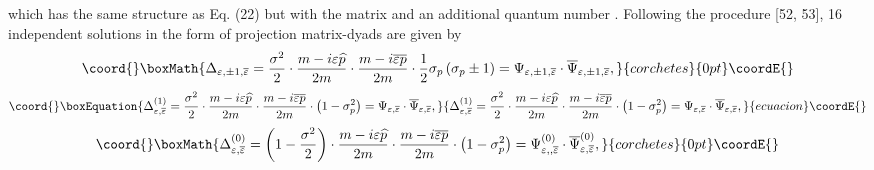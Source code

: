 \documentclass[a4paper,12pt]{article}
\begin{document}
which has the same structure as Eq. (22) but with the matrix
\coordHE{} and an additional
quantum number \coordHE{}. Following the
procedure [52, 53], 16 independent solutions in the form of
projection matrix-dyads are given by
\[\coord{}\boxMath{
\Delta _{\varepsilon ,\pm 1,\overline{\varepsilon }}=\frac{\sigma
^2}2\cdot \frac{m-i\varepsilon \widehat{p}}{2m}\cdot
\frac{m-i\overline{\varepsilon } \overline{p}}{2m}\cdot \frac
12\sigma _p\left( \sigma _p\pm 1\right) =\Psi _{\varepsilon ,\pm
1,\overline{\varepsilon }}\cdot \overline{\Psi } _{\varepsilon
,\pm 1,\overline{\varepsilon }} ,
}{corchetes}{0pt}\coordE{}\]
\begin{equation}\coord{}\boxEquation{
\Delta _{\varepsilon ,\overline{\varepsilon }}^{(1)}=\frac{\sigma
^2}2\cdot \frac{m-i\varepsilon \widehat{p}}{2m}\cdot
\frac{m-i\overline{\varepsilon } \overline{p}}{2m}\cdot \left(
1-\sigma _p^2\right) =\Psi _{\varepsilon , \overline{\varepsilon
}}\cdot \overline{\Psi }_{\varepsilon ,\overline{ \varepsilon }} ,
\label{33}
}{
\Delta _{\varepsilon ,\overline{\varepsilon }}^{(1)}=\frac{\sigma
^2}2\cdot \frac{m-i\varepsilon \widehat{p}}{2m}\cdot
\frac{m-i\overline{\varepsilon } \overline{p}}{2m}\cdot \left(
1-\sigma _p^2\right) =\Psi _{\varepsilon , \overline{\varepsilon
}}\cdot \overline{\Psi }_{\varepsilon ,\overline{ \varepsilon }} ,
}{ecuacion}\coordE{}\end{equation}
\[\coord{}\boxMath{
\Delta _{\varepsilon ,\overline{\varepsilon }}^{(0)}=\left(
1-\frac{\sigma ^2 }2\right) \cdot \frac{m-i\varepsilon
\widehat{p}}{2m}\cdot \frac{m-i \overline{\varepsilon
}\overline{p}}{2m}\cdot \left( 1-\sigma _p^2\right) =\Psi
_{\varepsilon ,,\overline{\varepsilon }}^{(0)}\cdot \overline{\Psi
} _{\varepsilon ,\overline{\varepsilon }}^{(0)} ,
}{corchetes}{0pt}\coordE{}\]
\end{document}
